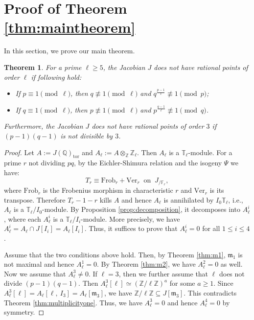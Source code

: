 \documentclass[a4paper, 12pt]{amsart}
\newtheorem{thm}{Theorem}[section]
\theoremstyle{definition}
\theoremstyle{remark}
\numberwithin{equation}{section} \numberwithin{table}{section}
\begin{document}
\section{Proof of Theorem \ref{thm:maintheorem}}\label{sec:proof}
In this section, we prove our main theorem.
\begin{thm}
For a prime $\ell\geq 5$, the Jacobian $J$ does not have rational points of order $\ell$ if following hold:
\begin{itemize}
\item If $p\equiv 1 {{ \!\pmod {\ell}}}$, then $q\not\equiv 1 {{ \!\pmod {\ell}}}$ and $q^{\frac{p-1}{\ell}} \not\equiv 1 \pmod p$;
\item If $q\equiv 1 {{ \!\pmod {\ell}}}$, then $p\not\equiv 1 {{ \!\pmod {\ell}}}$ and $p^{\frac{q-1}{\ell}} \not\equiv 1 \pmod q$.
\end{itemize}
Furthermore, the Jacobian $J$ does not have rational points of order $3$ if $(p-1)(q-1)$ is not divisible by $3$.
\end{thm}
\begin{proof}
Let $A:=J({{\mathbb{Q}}})_{{\mathrm{tor}}}$ and $A_{\ell}:=A \otimes_{{\mathbb{Z}}} {{\mathbb{Z}}}_{\ell}$. Then $A_{\ell}$ is a ${{\mathbb{T}}}_{\ell}$-module. For a prime $r$ not dividing $pq$, by the Eichler-Shimura relation and the isogeny $\Psi$ we have:
$$
T_r \equiv {{\mathrm{Frob}}}_r+{{\mathrm{Ver}}}_r  ~\text{ on }~ J_{/{{{\mathbb{F}}}_r}},
$$
where ${{\mathrm{Frob}}}_r$ is the Frobenius morphism in characteristic $r$ and ${{\mathrm{Ver}}}_r$ is its transpose. Therefore $T_r-1-r$ kills $A$ and hence $A_{\ell}$ is annihilated by $I_0 {{\mathbb{T}}}_{\ell}$, i.e., $A_{\ell}$ is a ${{\mathbb{T}}}_{\ell}/{I_0}$-module. By Proposition \ref{prop:decomposition}, it decomposes into $A_{\ell}^i$, where each $A_{\ell}^i$ is a ${{\mathbb{T}}}_{\ell}/{I_i}$-module. More precisely, we have 
$A_{\ell}^i = A_{\ell} \cap J[I_i] = A_{\ell}[I_i]$. 
Thus, it suffices to prove that $A_{\ell}^i=0$ for all $1\leq i \leq 4$.

Assume that the two conditions above hold. Then, by Theorem \ref{thm:m1}, ${{\mathfrak{m}}}_1$ is not maximal and hence $A_{\ell}^1=0$. By Theorem \ref{thm:m2}, we have $A_{\ell}^2=0$ as well. Now we assume that $A_{\ell}^3 \neq 0$. If $\ell=3$, then we further assume that $\ell$ does not divide $(p-1)(q-1)$. 
Then $A_{\ell}^3[\ell] \simeq ({{{{\mathbb{Z}}}/{\ell{{\mathbb{Z}}}}}})^a$ for some $a \geq 1$. Since $A_{\ell}^3[\ell]=A_{\ell}[\ell, ~I_3]=A_{\ell}[{{\mathfrak{m}}}_3]$, we have ${{{{\mathbb{Z}}}/{\ell{{\mathbb{Z}}}}}} \subseteq J[{{\mathfrak{m}}}_3]$. This contradicts Theorem \ref{thm:multiplicityone}. Thus, we have $A_{\ell}^3=0$ and hence $A_{\ell}^4=0$ by symmetry. 
\end{proof}
\end{document}
